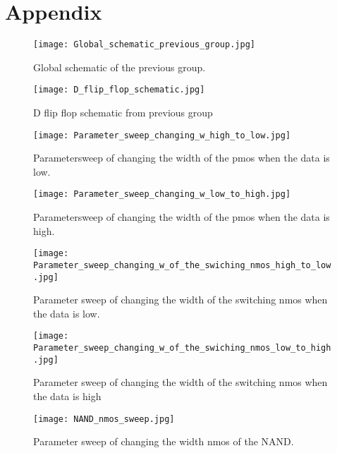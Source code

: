 \section{Appendix}\label{sec:appendix}

\begin{figure}[h]
\texttt{[image: Global\_schematic\_previous\_group.jpg]}
\caption{Global schematic of the previous group.}
\label{fig:Global_schematic_previous_group_figure}
\end{figure}

\begin{figure}[h]
 \texttt{[image: D\_flip\_flop\_schematic.jpg]}
 \caption{ D flip flop schematic from previous group}
 \label{fig:D_flip_flop_ previous_group_figure}
\end{figure}

\begin{figure}[h]
 \texttt{[image: Parameter\_sweep\_changing\_w\_high\_to\_low.jpg]}
 \caption{Parametersweep of changing the width of the pmos when the data is low.}
 \label{fig:parametersweep_changing_w_high_to_low_figure}
\end{figure}

\begin{figure}[h]
 \texttt{[image: Parameter\_sweep\_changing\_w\_low\_to\_high.jpg]}
 \caption{Parametersweep of changing the width of the pmos when the data is high.}
 \label{fig:parametersweep_changing_w_low_to_high_figure}
\end{figure}

\begin{figure}[h]
 \texttt{[image: Parameter\_sweep\_changing\_w\_of\_the\_swiching\_nmos\_high\_to\_low.jpg]}
 \caption{Parameter sweep of changing the width of the switching nmos when the data is low.}
 \label{fig:Parameter_sweep_changing_w_of_the_swiching_nmos_high_to_low_figure}
\end{figure}

\begin{figure}[h]
 \texttt{[image: Parameter\_sweep\_changing\_w\_of\_the\_swiching\_nmos\_low\_to\_high.jpg]}
 \caption{Parameter sweep of changing the width of the switching nmos when the data is high}
 \label{fig:Parameter_sweep_changing_w_of_the_swiching_nmos_low_to_high_figure}
\end{figure}

\begin{figure}[h]
 \texttt{[image: NAND\_nmos\_sweep.jpg]}
 \caption{Parameter sweep of changing the width nmos of the NAND.}
 \label{fig:NAND_nmos_sweep_figure}
\end{figure}

